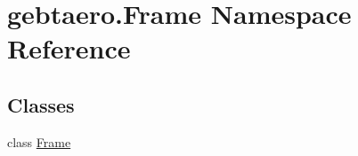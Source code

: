 \hypertarget{namespacegebtaero_1_1_frame}{}\section{gebtaero.\+Frame Namespace Reference}
\label{namespacegebtaero_1_1_frame}
\subsection*{Classes}
\begin{DoxyCompactItemize}
\item 
class \hyperlink{classgebtaero_1_1_frame_1_1_frame}{Frame}
\end{DoxyCompactItemize}
